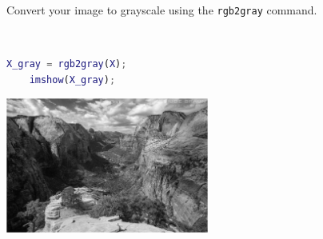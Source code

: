 Convert your image to grayscale using the \texttt{rgb2gray} command.

\begin{solution}\ 
    \begin{lstlisting}[language=Matlab]
    X_gray = rgb2gray(X);
    imshow(X_gray);
    \end{lstlisting}

    \begin{center}
        \includegraphics[width=0.5\textwidth]{img/e7p2.png}
    \end{center}
\end{solution}